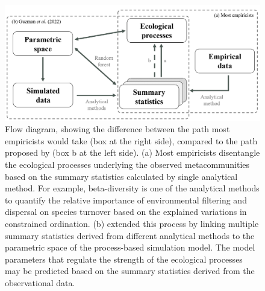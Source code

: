 	\begin{figure}
		\centering
		\includegraphics[width=\linewidth]{./figures/ppt/framework.png}
		\caption[Difference between the path most empiricists would take with the path proposed by \citet{guzman2022accounting}.]{\small
			Flow diagram, showing the difference between the path most empiricists would take (box at the right side), compared to the path proposed by \citet{guzman2022accounting} (box b at the left side). (a) Most empiricists disentangle the ecological processes underlying the observed metacommunities based on the summary statistics calculated by single analytical method. For example, beta-diversity is one of the analytical methods to quantify the relative importance of environmental filtering and dispersal on species turnover based on the explained variations in constrained ordination. (b) \citet{guzman2022accounting} extended this process by linking multiple summary statistics derived from different analytical methods to the parametric space of the process-based simulation model. The model parameters that regulate the strength of the ecological processes may be predicted based on the summary statistics derived from the observational data.}
		\label{fig:framework}
	\end{figure}

